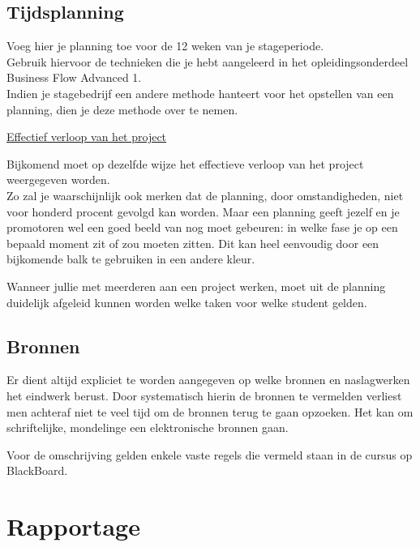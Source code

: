 \documentclass[a4paper]{article}
\begin{document}
    \newpage

  \subsection{Tijdsplanning}
    Voeg hier je planning toe voor de 12 weken van je stageperiode.\\
    Gebruik hiervoor de technieken die je hebt aangeleerd in het opleidingsonderdeel
    Business Flow Advanced 1.\\
    Indien je stagebedrijf een andere methode hanteert voor het opstellen van een
    planning, dien je deze methode over te nemen.\par
    \underline{Effectief verloop van het project}\par
    Bijkomend moet op dezelfde wijze het effectieve verloop van het project
    weergegeven worden.\\
    Zo zal je waarschijnlijk ook merken dat de planning, door omstandigheden, niet voor
    honderd procent gevolgd kan worden. Maar een planning geeft jezelf en je promotoren
    wel een goed beeld van nog moet gebeuren: in welke fase je op een bepaald moment zit
    of zou moeten zitten. Dit kan heel eenvoudig door een bijkomende balk te gebruiken in
    een andere kleur.\par
    Wanneer jullie met meerderen aan een project werken, moet uit de planning
    duidelijk afgeleid kunnen worden welke taken voor welke student gelden.

  \subsection{Bronnen}
    Er dient altijd expliciet te worden aangegeven op welke bronnen en naslagwerken
    het eindwerk berust. Door systematisch hierin de bronnen te vermelden verliest
    men achteraf niet te veel tijd om de bronnen terug te gaan opzoeken. Het kan
    om schriftelijke, mondelinge een elektronische bronnen gaan.\par
    Voor de omschrijving gelden enkele vaste regels die vermeld staan in de
    cursus op BlackBoard.

  \section{Rapportage}
\end{document}
